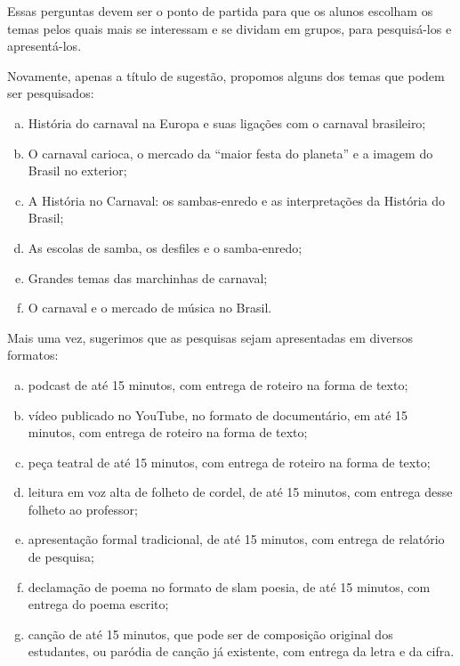 \documentclass[11pt]{extarticle}
\begin{document}
Essas perguntas devem ser o ponto de partida para que os alunos escolham
os temas pelos quais mais se interessam e se dividam em grupos, para
pesquisá-los e apresentá-los.

Novamente, apenas a título de sugestão, propomos alguns dos temas que
podem ser pesquisados:

\begin{enumerate}[(a)]  

\item História do carnaval na Europa e suas ligações com o carnaval
brasileiro;

\item O carnaval carioca, o mercado da ``maior festa do planeta'' e a
imagem do Brasil no exterior;

\item A História no Carnaval: os sambas-enredo e as interpretações da
História do Brasil;

\item As escolas de samba, os desfiles e o samba-enredo;

\item Grandes temas das marchinhas de carnaval;

\item O carnaval e o mercado de música no Brasil.

\end{enumerate} 


Mais uma vez, sugerimos que as pesquisas sejam apresentadas em diversos
formatos:


\begin{enumerate}[(a)]  

\item podcast de até 15 minutos, com entrega de roteiro na forma de texto;

\item vídeo publicado no YouTube, no formato de documentário, em até 15
minutos, com entrega de roteiro na forma de texto;

\item peça teatral de até 15 minutos, com entrega de roteiro na forma de
texto;

\item leitura em voz alta de folheto de cordel, de até 15 minutos, com
entrega desse folheto ao professor;

\item apresentação formal tradicional, de até 15 minutos, com entrega de
relatório de pesquisa;

\item declamação de poema no formato de slam poesia, de até 15 minutos, com
entrega do poema escrito;

\item canção de até 15 minutos, que pode ser de composição original dos
estudantes, ou paródia de canção já existente, com entrega da letra e da
cifra.

\end{enumerate} 
\end{document}
